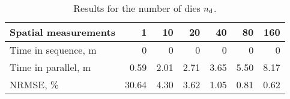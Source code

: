 \begin{table}[h]
  \centering
  \caption{Results for the number of dies ${n_{\text{d}}}$.}
  \begin{tabular*}{1\linewidth}{lrrrrrr}
    \toprule
    Spatial measurements & 1 & 10 & 20 & 40 & 80 & 160 \\
    \midrule
    Time in sequence, m & 0 & 0 & 0 & 0 & 0 & 0 \\
    Time in parallel, m &  0.59 & 2.01 & 2.71 & 3.65 & 5.50 & 8.17 \\
    NRMSE, \%           & 30.64 & 4.30 & 3.62 & 1.05 & 0.81 & 0.62 \\
    \bottomrule
  \end{tabular*}
  \vspace{-1em}
\end{table}
